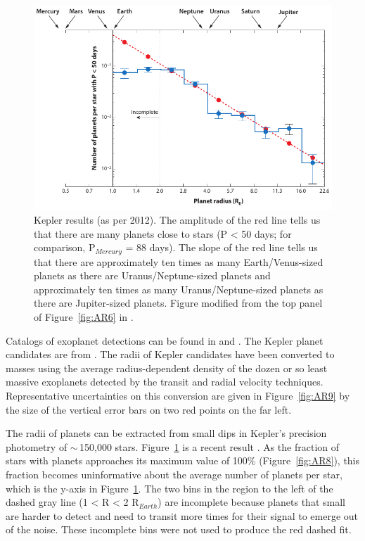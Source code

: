 \begin{figure}[!hbt]
	\centering
	\includegraphics[width=0.9\linewidth]{figures/AnnRevs/AR10.pdf}
	\caption[Kepler results]{Kepler results (as per 2012). The amplitude of the red line tells us that there are many planets close to stars (P < 50 days; for comparison, P$_{Mercury}$ = 88 days). The slope of the red line tells us that there are approximately ten times as many Earth/Venus-sized planets as there are Uranus/Neptune-sized planets and approximately ten times as many Uranus/Neptune-sized planets as there are Jupiter-sized planets. Figure modified from the top panel of Figure~\ref{fig:AR6} in \citet{Howard2012}.}
	\label{fig:AR10}
\end{figure}

Catalogs of exoplanet detections can be found in \citet{Schneider2011} and \citet{Wright2010}. The Kepler planet candidates are from \citet{Borucki2011}. The radii of Kepler candidates have been converted to masses using the average radius-dependent density of the dozen or so least massive exoplanets detected by the transit and radial velocity techniques. Representative uncertainties on this conversion are given in Figure~\ref{fig:AR9} by the size of the vertical error bars on two red points on the far left.

The radii of planets can be extracted from small dips in Kepler's precision photometry of $\sim$\,150,000 stars. Figure~\ref{fig:AR10} is a recent result \citep{Howard2012}. As the fraction of stars with planets approaches its maximum value of 100\% (Figure~\ref{fig:AR8}), this fraction becomes uninformative about the average number of planets per star, which is the y-axis in Figure~\ref{fig:AR10}. The two bins in the region to the left of the dashed gray line (1 < R < 2 R$_{Earth}$) are incomplete because planets that small are harder to detect and need to transit more times for their signal to emerge out of the noise. These incomplete bins were not used to produce the red dashed fit. 


